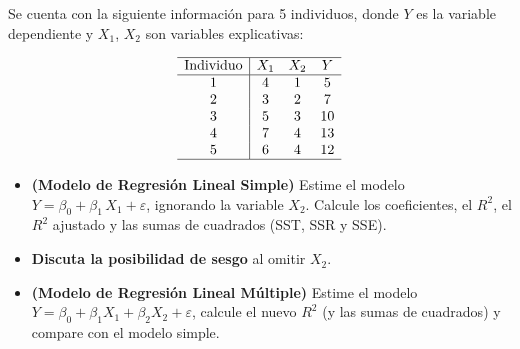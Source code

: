 \documentclass[10pt,a4paper]{article}
\begin{document}
Se cuenta con la siguiente información para 5 individuos, donde $Y$ es la variable dependiente y $X_1$, $X_2$ son variables explicativas:

\[
\begin{array}{c|ccc}
\hline
\text{Individuo} & X_1 & X_2 & Y \\
\hline
1 & 4 & 1 & 5 \\
2 & 3 & 2 & 7 \\
3 & 5 & 3 & 10 \\
4 & 7 & 4 & 13 \\
5 & 6 & 4 & 12 \\
\hline
\end{array}
\]

\begin{itemize}
  \item \textbf{(Modelo de Regresión Lineal Simple)} Estime el modelo $Y = \beta_0 + \beta_1\,X_1 + \varepsilon$, ignorando la variable $X_2$. Calcule los coeficientes, el $R^2$, el $R^2$ ajustado y las sumas de cuadrados (SST, SSR y SSE).
  \item \textbf{Discuta la posibilidad de sesgo} al omitir $X_2$.
  \item \textbf{(Modelo de Regresión Lineal Múltiple)} Estime el modelo $Y = \beta_0 + \beta_1 X_1 + \beta_2 X_2 + \varepsilon$, calcule el nuevo $R^2$ (y las sumas de cuadrados) y compare con el modelo simple.
\end{itemize}
\end{document}
